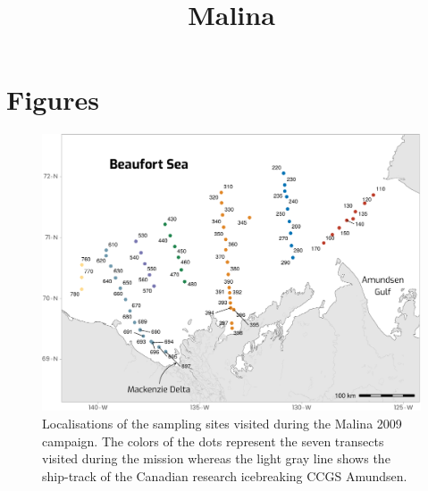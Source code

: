 \documentclass[essd, manuscript]{copernicus}
\begin{document}
\title{Malina}


    





\received{}
\pubdiscuss{} %
\revised{}
\accepted{}
\published{}



\maketitle

\begin{abstract}
\end{abstract}


\introduction  %


\section{Figures}

\begin{figure}[H]
	\centering
	\includegraphics[scale = 1]{../../../graphs/fig01.pdf}
	\caption{Localisations of the sampling sites visited during the Malina 2009 campaign. The colors of the dots represent the seven transects visited during the mission whereas the light gray line shows the ship-track of the Canadian research icebreaking CCGS Amundsen.}
\end{figure}
\end{document}
